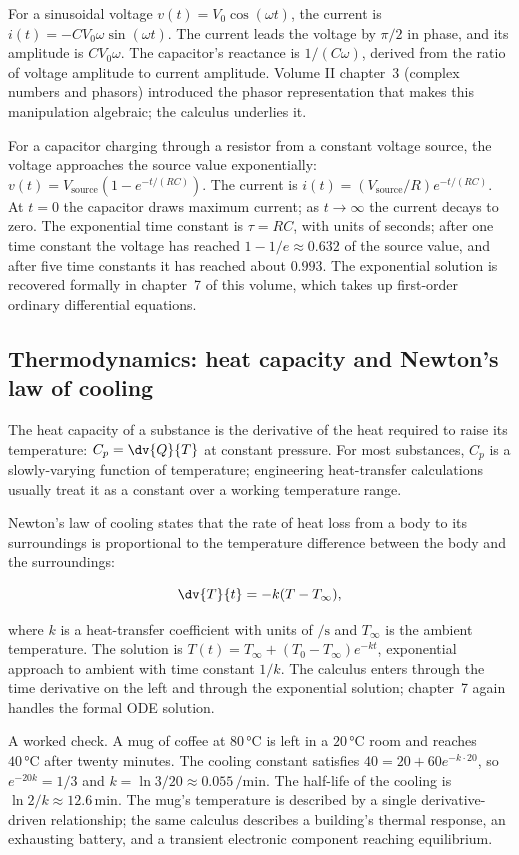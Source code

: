 For a sinusoidal voltage $v(t) = V_{0} \cos(\omega t)$, the current
is $i(t) = -C V_{0} \omega \sin(\omega t)$. The current leads the
voltage by $\pi/2$ in phase, and its amplitude is $C V_{0} \omega$.
The capacitor's reactance is $1/(C \omega)$, derived from the
ratio of voltage amplitude to current amplitude. Volume II
chapter~3 (complex numbers and phasors) introduced the phasor
representation that makes this manipulation algebraic; the
calculus underlies it.

For a capacitor charging through a resistor from a constant
voltage source, the voltage approaches the source value
exponentially: $v(t) = V_{\text{source}} (1 - e^{-t/(RC)})$. The
current is $i(t) = (V_{\text{source}}/R) e^{-t/(RC)}$. At $t = 0$
the capacitor draws maximum current; as $t \to \infty$ the
current decays to zero. The exponential time constant is $\tau =
RC$, with units of seconds; after one time constant the voltage
has reached $1 - 1/e \approx 0.632$ of the source value, and after
five time constants it has reached about $0.993$. The exponential
solution is recovered formally in chapter~7 of this volume,
which takes up first-order ordinary differential equations.

\subsection{Thermodynamics: heat capacity and Newton's law of cooling}

The heat capacity of a substance is the derivative of the heat
required to raise its temperature: $C_{p} = \dv{Q}{T}$ at constant
pressure. For most substances, $C_{p}$ is a slowly-varying
function of temperature; engineering heat-transfer calculations
usually treat it as a constant over a working temperature range.

Newton's law of cooling states that the rate of heat loss from a
body to its surroundings is proportional to the temperature
difference between the body and the surroundings:

\[
\dv{T}{t} = -k (T - T_{\infty}),
\]

where $k$ is a heat-transfer coefficient with units of
$\si{\per\second}$ and $T_{\infty}$ is the ambient temperature. The
solution is $T(t) = T_{\infty} + (T_{0} - T_{\infty}) e^{-k t}$,
exponential approach to ambient with time constant $1/k$. The
calculus enters through the time derivative on the left and through
the exponential solution; chapter~7 again handles the formal ODE
solution.

A worked check. A mug of coffee at $80\,\si{\degreeCelsius}$ is
left in a $20\,\si{\degreeCelsius}$ room and reaches $40\,\si
{\degreeCelsius}$ after twenty minutes. The cooling constant
satisfies $40 = 20 + 60 e^{-k \cdot 20}$, so $e^{-20 k} = 1/3$ and
$k = \ln 3 / 20 \approx 0.055\,\si{\per\minute}$. The half-life
of the cooling is $\ln 2 / k \approx 12.6\,\si{\minute}$. The
mug's temperature is described by a single derivative-driven
relationship; the same calculus describes a building's thermal
response, an exhausting battery, and a transient electronic
component reaching equilibrium.

